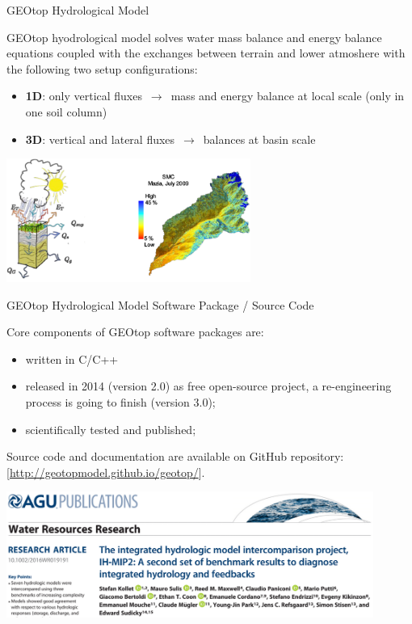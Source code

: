 \documentclass[ignorenonframetext,]{beamer}
\providecommand{\tightlist}{%
  \setlength{\itemsep}{0pt}\setlength{\parskip}{0pt}}
\begin{document}
\begin{frame}{GEOtop Hydrological Model}

GEOtop hyodrological model solves water mass balance and energy balance
equations coupled with the exchanges between terrain and lower atmoshere
with the following two setup configurations:

\begin{itemize}
\item
  \textbf{1D}: only vertical fluxes \(\,\to\,\) mass and energy balance
  at local scale (only in one soil column)
\item
  \textbf{3D}: vertical and lateral fluxes \(\,\to\,\) balances at basin
  scale
\end{itemize}

\includegraphics[width=0.60000\textwidth]{resources/images/geotop_ET_SWC.png}\\

\end{frame}

\begin{frame}{GEOtop Hydrological Model Software Package / Source Code}

Core components of GEOtop software packages are:

\begin{itemize}
\tightlist
\item
  written in C/C++
\item
  released in 2014 (version 2.0) as free open-source project, a
  re-engineering process is going to finish (version 3.0);
\item
  scientifically tested and published;
\end{itemize}

Source code and documentation are available on GitHub repository:
{[}\url{http://geotopmodel.github.io/geotop/}{]}.

\includegraphics[width=0.90000\textwidth]{resources/images/geotop_paper_2017.png}\\

\end{frame}
\end{document}
